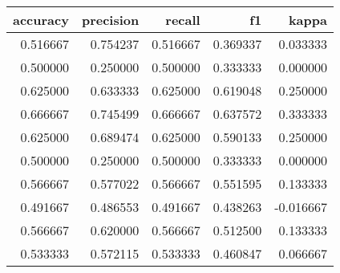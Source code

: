 \begin{tabular}{rrrrr}
\toprule
accuracy & precision & recall & f1 & kappa \\
\midrule
0.516667 & 0.754237 & 0.516667 & 0.369337 & 0.033333 \\
0.500000 & 0.250000 & 0.500000 & 0.333333 & 0.000000 \\
0.625000 & 0.633333 & 0.625000 & 0.619048 & 0.250000 \\
0.666667 & 0.745499 & 0.666667 & 0.637572 & 0.333333 \\
0.625000 & 0.689474 & 0.625000 & 0.590133 & 0.250000 \\
0.500000 & 0.250000 & 0.500000 & 0.333333 & 0.000000 \\
0.566667 & 0.577022 & 0.566667 & 0.551595 & 0.133333 \\
0.491667 & 0.486553 & 0.491667 & 0.438263 & -0.016667 \\
0.566667 & 0.620000 & 0.566667 & 0.512500 & 0.133333 \\
0.533333 & 0.572115 & 0.533333 & 0.460847 & 0.066667 \\
\bottomrule
\end{tabular}
